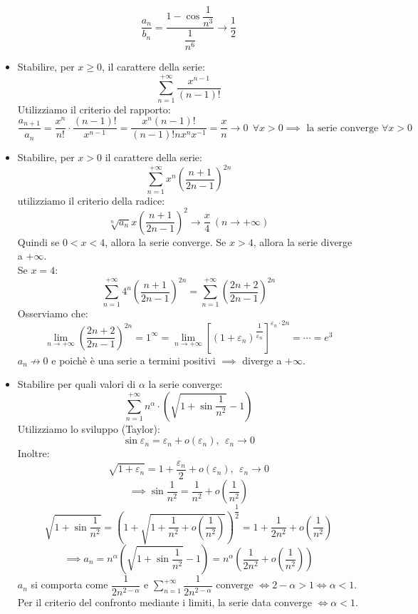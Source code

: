 \documentclass[../../main.tex]{subfiles}
\begin{document}
\begin{itemize}
\[              \dfrac{a_n}{b_n} = \dfrac{1-\cos{\dfrac{1}{n^3}}}{\dfrac{1}{n^6}} \to \dfrac{1}{2}
          \]
    \item Stabilire, per $x\geq0$, il carattere della serie:
          \[
              \sum_{n=1}^{+\infty} \dfrac{x^{n-1}}{(n-1)!}
          \]
          Utilizziamo il criterio del rapporto:
          \[
              \dfrac{a_{n+1}}{a_n} = \dfrac{x^n}{n!} \cdot \dfrac{(n-1)!}{x^{n-1}} = \dfrac{x^n(n-1)!}{(n-1)!nx^nx^{-1}} = \dfrac{x}{n} \to 0 \ \ \forall x > 0 \implies \text{ la serie converge } \forall x > 0
          \]
    \item Stabilire, per $x > 0$ il carattere della serie:
          \[
              \sum_{n=1}^{+\infty} x^n (\dfrac{n+1}{2n-1})^{2n}
          \]
          utilizziamo il criterio della radice:
          \[
              \sqrt[n]{a_n} x\left(\dfrac{n+1}{2n-1}\right)^2 \rightarrow \dfrac{x}{4}\ (n \to +\infty)
          \]
          Quindi se $0 < x < 4$, allora la serie converge. Se $x > 4$, allora la serie
          diverge a $+\infty$. \\ Se $x = 4$:
          \[
              \sum_{n=1}^{+\infty} 4^n\left(\dfrac{n+1}{2n-1}\right)^{2n} = \sum_{n=1}^{+\infty}\left(\dfrac{2n+2}{2n-1}\right)^{2n}
          \]
          Osserviamo che:
          \[
              \lim_{n\to+\infty} \left(\dfrac{2n+2}{2n-1}\right)^{2n} = 1^\infty
              = \lim_{n\to+\infty} \left[(1+\varepsilon_n)^{\dfrac{1}{\varepsilon_n}}\right]^{\varepsilon_n\cdot 2n}
              = \cdots = e^3
          \]
          $a_n \not\to 0$ e poichè è una serie a termini positivi $\implies$ diverge a $+\infty$.
    \item Stabilire per quali valori di $\alpha$ la serie converge:
          \[
              \sum_{n=1}^{+\infty} n^\alpha \cdot (\sqrt{1+\sin\dfrac{1}{n^2}} -1)
          \]
          Utilizziamo lo sviluppo (Taylor):
          \[
              \sin{\varepsilon_n} = \varepsilon_n + o(\varepsilon_n), \ \ \varepsilon_n \to 0
          \]
          Inoltre:
          \[
              \sqrt{1+\varepsilon_n} = 1 + \dfrac{\varepsilon_n}{2} + o(\varepsilon_n), \ \ \varepsilon_n \to 0
          \]
          \[
              \implies \sin{\dfrac{1}{n^2}} = \dfrac{1}{n^2} + o(\dfrac{1}{n^2})
          \]
          \[
              \sqrt{1+\sin{\dfrac{1}{n^2}}} = \left(1 +\sqrt{1+\dfrac{1}{n^2} + o(\dfrac{1}{n^2})}\right)^{\dfrac{1}{2}} = 1 + \dfrac{1}{2n^2} + o(\dfrac{1}{n^2})
          \]
          \[
              \implies a_n = n^\alpha (\sqrt{1+\sin{\dfrac{1}{n^2}}} - 1) = n^\alpha \left(\dfrac{1}{2n^2} + o(\dfrac{1}{n^2})\right)
          \]
          $a_n$ si comporta come $\dfrac{1}{2n^{2-\alpha}}$ e $\sum_{n=1}^{+\infty} \dfrac{1}{2n^{2-\alpha}}$ converge $\iff 2-\alpha > 1 \iff \alpha < 1$. Per il criterio del confronto mediante i limiti, la serie data converge $\iff \alpha < 1$.
\end{itemize}
\end{document}
